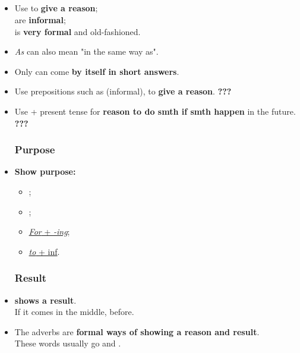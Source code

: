 \subsection{}
\begin{itemize}
    \subsubsection{Reason}
    \item[\doot] Use  to \textbf{give a reason};\\
     are \textbf{informal};\\
     is \textbf{very formal} and old-fashioned.
    \item[\aast] \textit{As} can also mean "in the same way as".
    \item[\doot] Only  can come \textbf{by itself in short answers}.
    \item[\doot] Use prepositions such as  (informal),
     to \textbf{give a reason}. \textbf{???}
    \item[\doot] Use  + present tense for \textbf{reason to do smth if smth happen}
    in the future. \textbf{???}
    \subsubsection{Purpose}
    \item[\doot] \textbf{Show purpose:}
    \begin{itemize}
        \item[\daash] ;
        \item[\daash] ;
        \item[\daash] \underline{\textit{For} + \textit{-ing}};
        \item[\daash] \underline{\textit{to} + inf}.
\end{itemize}
    \subsubsection{Result}
    \item[\doot]  \textbf{shows a result}.\\
    If it comes in the middle,  before.
    \item[\doot] The adverbs 
    are \textbf{formal ways of showing a reason and result}.\\
    These words usually go  and .


\end{itemize}
